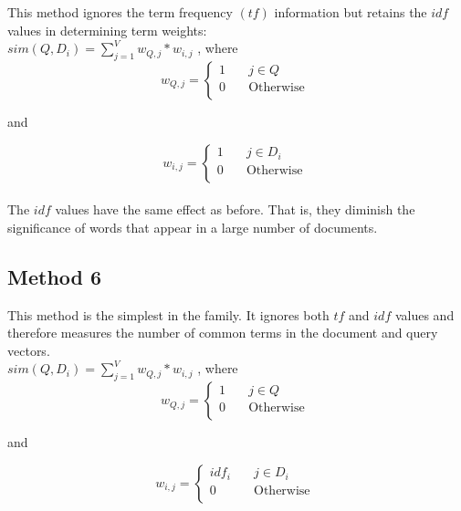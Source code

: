 This method ignores the term frequency $(tf)$ information but retains the $idf$ values in determining term weights:\\

\(sim(Q,D_i) = \sum_{j=1}^{V}w_{Q,j}*w_{i,j}\) , where 
\[ w_{Q,j} =
  \begin{cases}
    1       & \quad  j \in Q \\
    0  & \quad \text{Otherwise } \\
  \end{cases}
\]

and

\[ w_{i,j} =
  \begin{cases}
    1       & \quad  j \in D_i \\
    0  & \quad \text{Otherwise } \\
  \end{cases}
\]\\

The $idf$ values have the same effect as before. That is, they diminish the significance of words that appear in a large number of documents.


\subsection{Method 6}

This method is the simplest in the family. It ignores both $tf$ and $idf$ values and therefore measures the number of common terms in the document and query vectors.\\

\(sim(Q,D_i) = \sum_{j=1}^{V}w_{Q,j}*w_{i,j}\) , where 
\[ w_{Q,j} =
  \begin{cases}
    1       & \quad  j \in Q \\
    0  & \quad \text{Otherwise } \\
  \end{cases}
\]

and

\[ w_{i,j} =
  \begin{cases}
    idf_i       & \quad  j \in D_i \\
    0  & \quad \text{Otherwise } \\
  \end{cases}
\]\\


